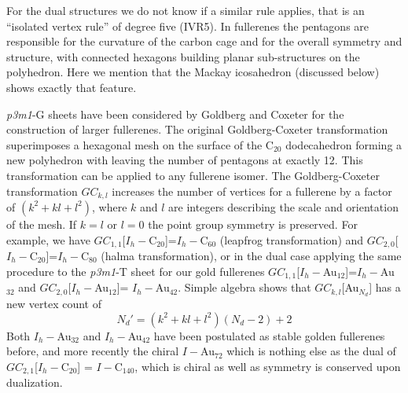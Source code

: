For the dual structures we do not know if a similar rule applies, that is an ``isolated vertex rule'' of degree five (IVR5). In fullerenes the pentagons are responsible for the curvature of the carbon cage and for the overall symmetry and structure, with connected hexagons building planar sub-structures on the polyhedron. Here we mention that the Mackay icosahedron (discussed below) shows exactly that feature.

{\it p3m1}-G sheets have been considered by Goldberg and Coxeter for the construction of larger fullerenes.\autocite{Goldberg_ClassMultiSymmetricPolyhedra_1937,Coxeter-1971,Dutour_GoldbergCoxeterConstructionvalent_2004} The original Goldberg-Coxeter transformation superimposes a hexagonal mesh on the surface of the C$_{20}$ dodecahedron forming a new polyhedron with leaving the number of pentagons at exactly 12.\autocite{Goldberg_ClassMultiSymmetricPolyhedra_1937,Coxeter-1971} This transformation can be applied to any fullerene isomer.\autocite{Schwerdtfeger_topologyfullerenes_2015} The Goldberg-Coxeter transformation $GC_{k,l}$ increases the number of vertices for a fullerene by a factor of $(k^2+kl+l^2)$, where $k$ and $l$ are integers describing the scale and orientation of the mesh.\autocite{Dutour_GoldbergCoxeterConstructionvalent_2004,Schwerdtfeger_topologyfullerenes_2015} If $k=l$ or $l=0$ the point group symmetry is preserved. For example, we have $GC_{1,1}$[$I_h-$C$_{20}$]=$I_h-$C$_{60}$ (leapfrog transformation)\autocite{Fowler-atlas-2006} and $GC_{2,0}$[$I_h-$C$_{20}$]=$I_h-$C$_{80}$ (halma transformation), or in the dual case applying the same procedure to the {\it p3m1}-T sheet for our gold fullerenes $GC_{1,1}$[$I_h-$Au$_{12}$]=$I_h-$Au$_{32}$ and $GC_{2,0}$[$I_h-$Au$_{12}$]= $I_h-$Au$_{42}$. Simple algebra shows that $GC_{k,l}$[Au$_{N_d}$] has a new vertex count of
\begin{equation}
  \label{eq:dualvertex} 
N_d'=(k^2+kl+l^2)(N_d-2)+2 
\end{equation}
Both $I_h-$Au$_{32}$ and $I_h-$Au$_{42}$ have been postulated as stable golden fullerenes before,\autocite{Johansson_Au3224CaratGolden_2004}
and more recently the chiral $I-$Au$_{72}$\autocite{Karttunen_IcosahedralAu72_2008} which is nothing else as the dual of $GC_{2,1}$[$I_h-$C$_{20}$] = $I-$C$_{140}$, which is chiral as well as symmetry is conserved upon dualization.

